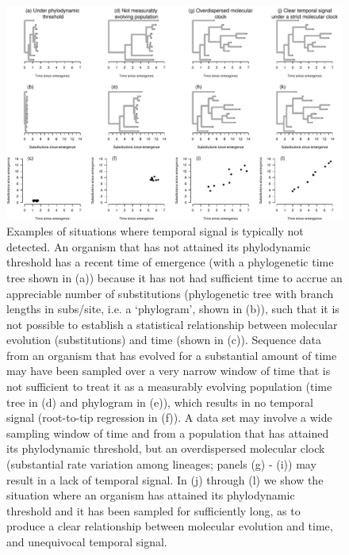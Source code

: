 \documentclass[11pt]{article}
\begin{document}
\begin{landscape}
	\begin{figure}[H]
		\begin{center}
			\includegraphics[scale=0.7, angle=0]{examples_temp_signal_thresholds_meps.pdf}
			\caption{Examples of situations where temporal signal is typically not detected. An organism that has not attained its phylodynamic threshold has a recent time of emergence (with a phylogenetic time tree shown in (a)) because it has not had sufficient time to accrue an appreciable number of substitutions (phylogenetic tree with branch lengths in subs/site, i.e. a `phylogram', shown in (b)), such that it is not possible to establish a statistical relationship between molecular evolution (substitutions) and time (shown in (c)). Sequence data from an organism that has evolved for a substantial amount of time may have been sampled over a very narrow window of time that is not sufficient to treat it as a measurably evolving population (time tree in (d) and phylogram in (e)), which results in no temporal signal (root-to-tip regression in (f)). A data set may involve a wide sampling window of time and from a population that has attained its phylodynamic threshold, but an overdispersed molecular clock (substantial rate variation among lineages; panels (g) - (i)) may result in a lack of temporal signal. In (j) through (l) we show the situation where an organism has attained its phylodynamic threshold and it has been sampled for sufficiently long, as to produce a clear relationship between molecular evolution and time, and unequivocal temporal signal.}
			\label{figure:Fig1}
		\end{center}
	\end{figure}
\end{landscape}
\end{document}
